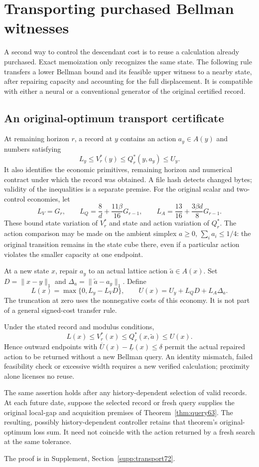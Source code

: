 \section{Transporting purchased Bellman witnesses}\label{sec:reuse72}
A second way to control the descendant cost is to reuse a calculation already purchased. Exact memoization only recognizes the same state. The following rule transfers a lower Bellman bound and its feasible upper witness to a nearby state, after repairing capacity and accounting for the full displacement. It is compatible with either a neural or a conventional generator of the original certified record.

\subsection{An original-optimum transport certificate}
At remaining horizon $r$, a record at $y$ contains an action $a_y\in A(y)$ and numbers satisfying
\[
 L_y\le V_r^*(y)\le Q_r^*(y,a_y)\le U_y.
\]
It also identifies the economic primitives, remaining horizon and numerical contract under which the record was obtained. A file hash detects changed bytes; validity of the inequalities is a separate premise. For the original scalar and two-control economies, let
\[
 L_V=G_r,\qquad L_Q=\frac8d+\frac{11\beta}{16}G_{r-1},
 \qquad L_A=\frac{13}{16}+\frac{3\beta d}{8}G_{r-1}.
\]
These bound state variation of $V_r^*$ and state and action variation of $Q_r^*$. The action comparison may be made on the ambient simplex $a\ge0$, $\sum_i a_i\le1/4$: the original transition remains in the state cube there, even if a particular action violates the smaller capacity at one endpoint.

At a new state $x$, repair $a_y$ to an actual lattice action $\widetilde a\in A(x)$. Set $D=\|x-y\|_1$ and $\Delta_a=\|\widetilde a-a_y\|_1$. Define
\begin{equation}\label{eq:witness-transport72}
 L(x)=\max\{0,L_y-L_VD\},\qquad
 U(x)=U_y+L_QD+L_A\Delta_a.
\end{equation}
The truncation at zero uses the nonnegative costs of this economy. It is not part of a general signed-cost transfer rule.

\begin{theorem}\label{thm:reuse72}
Under the stated record and modulus conditions,
\[
 L(x)\le V_r^*(x)\le Q_r^*(x,\widetilde a)\le U(x).
\]
Hence outward endpoints with $\overline U(x)-\underline L(x)\le\delta$ permit the actual repaired action to be returned without a new Bellman query. An identity mismatch, failed feasibility check or excessive width requires a new verified calculation; proximity alone licenses no reuse.

The same assertion holds after any history-dependent selection of valid records. At each future date, suppose the selected record or fresh query supplies the original local-gap and acquisition premises of Theorem~\ref{thm:query63}. The resulting, possibly history-dependent controller retains that theorem's original-optimum loss sum. It need not coincide with the action returned by a fresh search at the same tolerance.
\end{theorem}
\noindent The proof is in Supplement, Section~\ref{supp:transport72}.

